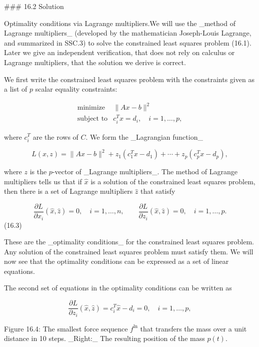 

### 16.2 Solution

Optimality conditions via Lagrange multipliers.We will use the _method of Lagrange multipliers_ (developed by the mathematician Joseph-Louis Lagrange, and summarized in SSC.3) to solve the constrained least squares problem (16.1). Later we give an independent verification, that does not rely on calculus or Lagrange multipliers, that the solution we derive is correct.

We first write the constrained least squares problem with the constraints given as a list of \(p\) scalar equality constraints:

\[\begin{array}{ll}\mbox{minimize}&\|Ax-b\|^{2}\\ \mbox{subject to}&c_{i}^{T}x=d_{i},\quad i=1,\ldots,p,\end{array}\]

where \(c_{i}^{T}\) are the rows of \(C\). We form the _Lagrangian function_

\[L(x,z)=\|Ax-b\|^{2}+z_{1}(c_{1}^{T}x-d_{1})+\cdots+z_{p}(c_{p}^{T}x-d_{p}),\]

where \(z\) is the \(p\)-vector of _Lagrange multipliers_. The method of Lagrange multipliers tells us that if \(\hat{x}\) is a solution of the constrained least squares problem, then there is a set of Lagrange multipliers \(\hat{z}\) that satisfy

\[\frac{\partial L}{\partial x_{i}}(\hat{x},\hat{z})=0,\quad i=1,\ldots,n,\qquad \frac{\partial L}{\partial z_{i}}(\hat{x},\hat{z})=0,\quad i=1,\ldots,p.\] (16.3)

These are the _optimality conditions_ for the constrained least squares problem. Any solution of the constrained least squares problem must satisfy them. We will now see that the optimality conditions can be expressed as a set of linear equations.

The second set of equations in the optimality conditions can be written as

\[\frac{\partial L}{\partial z_{i}}(\hat{x},\hat{z})=c_{i}^{T}\hat{x}-d_{i}=0, \quad i=1,\ldots,p,\]

Figure 16.4: The smallest force sequence \(f^{\ln}\) that transfers the mass over a unit distance in 10 steps. _Right:_ The resulting position of the mass \(p(t)\).

